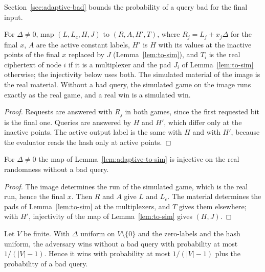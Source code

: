 Section~\ref{sec:adaptive-bad} bounds the probability of a query bad for the final input.

\begin{lemma}
  \label{lem:adaptive-to-sim}
  \leanok
  For $\Delta \neq 0$, map $(L, L_c, H, J)$ to $(R, A, H', T)$, where $R_j = L_j + x_j \Delta$ for
  the final $x$, $A$ are the active constant labels, $H'$ is $H$ with its values at the inactive
  points of the final $x$ replaced by $J$ (Lemma~\ref{lem:to-sim}), and $T_i$ is the real
  ciphertext of node $i$ if it is a multiplexer and the pad $J_i$ of Lemma~\ref{lem:to-sim}
  otherwise; the injectivity below uses both. The simulated material of the image is the real material. Without a bad query, the
  simulated game on the image runs exactly as the real game, and a real win is a simulated win.
\end{lemma}

\begin{proof}
  \leanok
  Requests are answered with $R_j$ in both games, since the first requested bit is the final one.
  Queries are answered by $H$ and $H'$, which differ only at the inactive points. The active output
  label is the same with $H$ and with $H'$, because the evaluator reads the hash only at active
  points.
\end{proof}

\begin{lemma}[Injectivity]
  \label{lem:adaptive-inj}
  \leanok
  For $\Delta \neq 0$ the map of Lemma~\ref{lem:adaptive-to-sim} is injective on the real
  randomness without a bad query.
\end{lemma}

\begin{proof}
  \leanok
  The image determines the run of the simulated game, which is the real run, hence the final $x$.
  Then $R$ and $A$ give $L$ and $L_c$. The material determines the pads of
  Lemma~\ref{lem:to-sim} at the multiplexers, and $T$ gives them elsewhere; with $H'$, injectivity
  of the map of Lemma~\ref{lem:to-sim} gives $(H, J)$.
\end{proof}

\begin{theorem}
  \label{thm:adaptive-not-bad}
  \leanok
  Let $V$ be finite. With $\Delta$ uniform on $V \setminus \{0\}$ and the zero-labels and the hash
  uniform, the adversary wins without a bad query with probability at most $1/(|V| - 1)$. Hence it
  wins with probability at most $1/(|V| - 1)$ plus the probability of a bad query.
\end{theorem}


